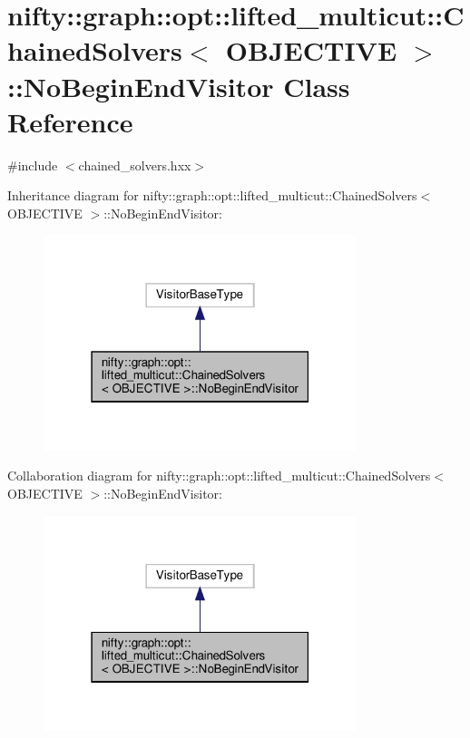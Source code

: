 \hypertarget{classnifty_1_1graph_1_1opt_1_1lifted__multicut_1_1ChainedSolvers_1_1NoBeginEndVisitor}{}\section{nifty\+:\+:graph\+:\+:opt\+:\+:lifted\+\_\+multicut\+:\+:Chained\+Solvers$<$ O\+B\+J\+E\+C\+T\+I\+VE $>$\+:\+:No\+Begin\+End\+Visitor Class Reference}
\label{classnifty_1_1graph_1_1opt_1_1lifted__multicut_1_1ChainedSolvers_1_1NoBeginEndVisitor}


{\ttfamily \#include $<$chained\+\_\+solvers.\+hxx$>$}



Inheritance diagram for nifty\+:\+:graph\+:\+:opt\+:\+:lifted\+\_\+multicut\+:\+:Chained\+Solvers$<$ O\+B\+J\+E\+C\+T\+I\+VE $>$\+:\+:No\+Begin\+End\+Visitor\+:
\nopagebreak
\begin{figure}[H]
\begin{center}
\leavevmode
\includegraphics[width=259pt]{classnifty_1_1graph_1_1opt_1_1lifted__multicut_1_1ChainedSolvers_1_1NoBeginEndVisitor__inherit__graph}
\end{center}
\end{figure}


Collaboration diagram for nifty\+:\+:graph\+:\+:opt\+:\+:lifted\+\_\+multicut\+:\+:Chained\+Solvers$<$ O\+B\+J\+E\+C\+T\+I\+VE $>$\+:\+:No\+Begin\+End\+Visitor\+:
\nopagebreak
\begin{figure}[H]
\begin{center}
\leavevmode
\includegraphics[width=259pt]{classnifty_1_1graph_1_1opt_1_1lifted__multicut_1_1ChainedSolvers_1_1NoBeginEndVisitor__coll__graph}
\end{center}
\end{figure}
